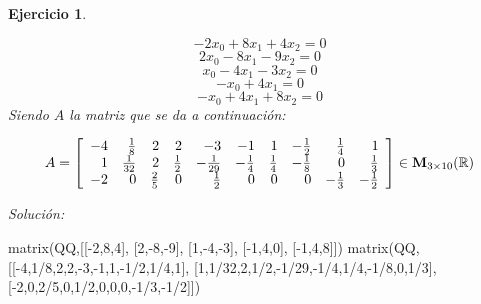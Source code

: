 \documentclass[12pt]{amsart}
\newtheorem{ejer}{Ejercicio}
\begin{document}
\begin{ejer}
\begin{minipage}{\textwidth}
\begin{tcolorbox}[colback = red!20!white,title=Versión Ecuaciones Implícitas]
\[ -2 x_{0} + 8 x_{1} + 4 x_{2} = 0 \]
\[ 2 x_{0} - 8 x_{1} - 9 x_{2} = 0 \]
\[ x_{0} - 4 x_{1} - 3 x_{2} = 0 \]
\[ -x_{0} + 4 x_{1} = 0 \]
\[ -x_{0} + 4 x_{1} + 8 x_{2} = 0 \]
Siendo $A$ la matriz que se da a continuación:
\end{tcolorbox}
\end{minipage}
\[ A = \left[\begin{array}{rrrrrrrrrr}
-4 & \frac{1}{8} & 2 & 2 & -3 & -1 & 1 & -\frac{1}{2} & \frac{1}{4} & 1 \\
1 & \frac{1}{32} & 2 & \frac{1}{2} & -\frac{1}{29} & -\frac{1}{4} & \frac{1}{4} & -\frac{1}{8} & 0 & \frac{1}{3} \\
-2 & 0 & \frac{2}{5} & 0 & \frac{1}{2} & 0 & 0 & 0 & -\frac{1}{3} & -\frac{1}{2}
\end{array}\right] \in {\bf M}_{3\times 10}({\mathbb R})\]
\end{ejer}

{\it Soluci\'on:}

\begin{sageblock}
matrix(QQ,[[-2,8,4],
[2,-8,-9],
[1,-4,-3],
[-1,4,0],
[-1,4,8]])
matrix(QQ,[[-4,1/8,2,2,-3,-1,1,-1/2,1/4,1],
[1,1/32,2,1/2,-1/29,-1/4,1/4,-1/8,0,1/3],
[-2,0,2/5,0,1/2,0,0,0,-1/3,-1/2]])
\end{sageblock}

\end{document}
